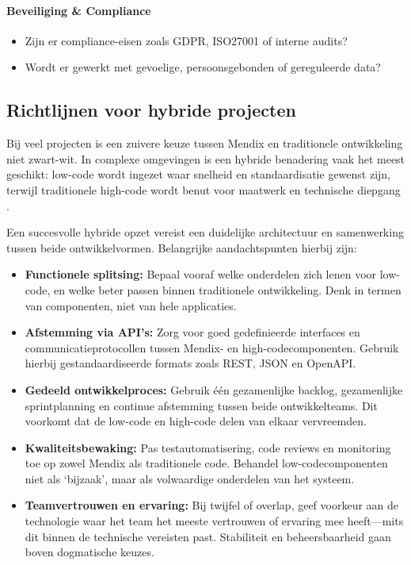\paragraph{Beveiliging \& Compliance}
\begin{itemize}
    \item Zijn er compliance-eisen zoals GDPR, ISO27001 of interne audits?
    \item Wordt er gewerkt met gevoelige, persoonsgebonden of gereguleerde data?
\end{itemize}


\subsection{Richtlijnen voor hybride projecten}
Bij veel projecten is een zuivere keuze tussen Mendix en traditionele ontwikkeling niet zwart-wit. In complexe omgevingen is een hybride benadering vaak het meest geschikt: low-code wordt ingezet waar snelheid en standaardisatie gewenst zijn, terwijl traditionele high-code wordt benut voor maatwerk en technische diepgang \autocite{PerfectionGeeks2023}.

Een succesvolle hybride opzet vereist een duidelijke architectuur en samenwerking tussen beide ontwikkelvormen. Belangrijke aandachtspunten hierbij zijn:

\begin{itemize}
    \item \textbf{Functionele splitsing:} Bepaal vooraf welke onderdelen zich lenen voor low-code, en welke beter passen binnen traditionele ontwikkeling. Denk in termen van componenten, niet van hele applicaties.
    
    \item \textbf{Afstemming via API’s:} Zorg voor goed gedefinieerde interfaces en communicatieprotocollen tussen Mendix- en high-codecomponenten. Gebruik hierbij gestandaardiseerde formats zoals REST, JSON en OpenAPI.
    
    \item \textbf{Gedeeld ontwikkelproces:} Gebruik één gezamenlijke backlog, gezamenlijke sprintplanning en continue afstemming tussen beide ontwikkelteams. Dit voorkomt dat de low-code en high-code delen van elkaar vervreemden.
    
    \item \textbf{Kwaliteitsbewaking:} Pas testautomatisering, code reviews en monitoring toe op zowel Mendix als traditionele code. Behandel low-codecomponenten niet als ‘bijzaak’, maar als volwaardige onderdelen van het systeem.
    
    \item \textbf{Teamvertrouwen en ervaring:} Bij twijfel of overlap, geef voorkeur aan de technologie waar het team het meeste vertrouwen of ervaring mee heeft—mits dit binnen de technische vereisten past. Stabiliteit en beheersbaarheid gaan boven dogmatische keuzes.
\end{itemize}

